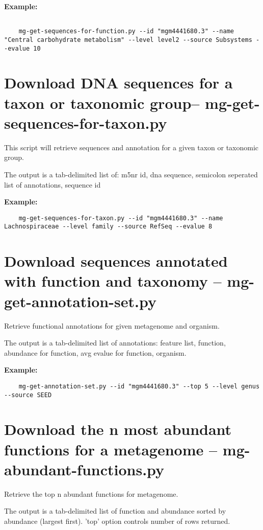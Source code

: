 \textbf{Example:}
\begin{lstlisting}

    mg-get-sequences-for-function.py --id "mgm4441680.3" --name "Central carbohydrate metabolism" --level level2 --source Subsystems --evalue 10
\end{lstlisting}
\section{Download DNA sequences for a taxon or taxonomic group-- mg-get-sequences-for-taxon.py}

This script will retrieve sequences and annotation for a given taxon or taxonomic group.

The output is a tab-delimited list of: m5nr id, dna sequence, semicolon seperated list of annotations, sequence id

\textbf{Example:}
\begin{lstlisting}
    mg-get-sequences-for-taxon.py --id "mgm4441680.3" --name Lachnospiraceae --level family --source RefSeq --evalue 8
\end{lstlisting}
\section{Download sequences annotated with function and taxonomy -- mg-get-annotation-set.py}

Retrieve functional annotations for given metagenome and organism.

The output is a tab-delimited list of annotations: feature list, function, abundance for function, avg evalue for function, organism.

\textbf{Example:}
\begin{lstlisting}
    mg-get-annotation-set.py --id "mgm4441680.3" --top 5 --level genus --source SEED
\end{lstlisting}

\section{Download the n most abundant functions for a metagenome -- mg-abundant-functions.py}

    Retrieve the top n abundant functions for metagenome.

The output is a tab-delimited list of function and abundance sorted by abundance (largest first). 'top' option controls number of rows returned.


